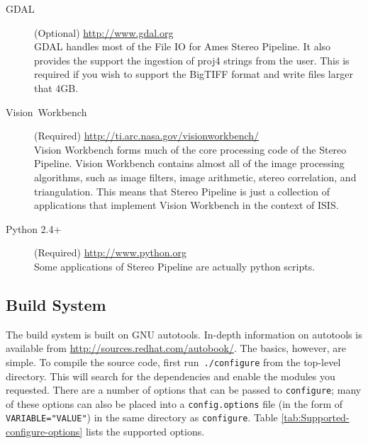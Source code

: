 \begin{description}
\item [{GDAL}] (Optional) \url{http://www.gdal.org}\\

GDAL handles most of the File IO for Ames Stereo Pipeline. It also
provides the support the ingestion of proj4 strings from the
user. This is required if you wish to support the BigTIFF format and
write files larger that 4GB.

\item [{Vision~Workbench}] (Required) \url{http://ti.arc.nasa.gov/visionworkbench/}\\

Vision Workbench forms much of the core processing code of the Stereo
Pipeline. Vision Workbench contains almost all of the image processing
algorithms, such as image filters, image arithmetic, stereo
correlation, and triangulation. This means that Stereo Pipeline is
just a collection of applications that implement Vision Workbench in
the context of ISIS.

\item [{Python 2.4+}] (Required) \url{http://www.python.org}\\

Some applications of Stereo Pipeline are actually python scripts.

\end{description}

\subsection{Build System}

The build system is built on GNU autotools. In-depth information on
autotools is available from \url{http://sources.redhat.com/autobook/}.
The basics, however, are simple. To compile the source code, first
run~\verb#./configure# from the top-level directory. This will search
for the dependencies and enable the modules you requested. There are
a number of options that can be passed to \verb#configure#; many
of these options can also be placed into a \verb#config.options#
file (in the form of \verb#VARIABLE="VALUE"#) in the same directory
as \verb#configure#. Table \ref{tab:Supported-configure-options}
lists the supported options.

